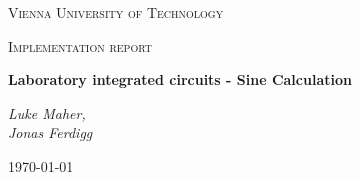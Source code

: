 
\begin{titlepage}
	\centering
	{\scshape\LARGE Vienna University of Technology \par}
	\vspace{1cm}
	{\scshape\Large Implementation report \par}
	\vspace{1.5cm}
	{\huge\bfseries Laboratory integrated circuits - Sine Calculation \par}
	\vspace{2cm}
	{\Large\itshape Luke Maher, \\ Jonas Ferdigg \par}
	\vfill

	{\large \today\par}
\end{titlepage}

